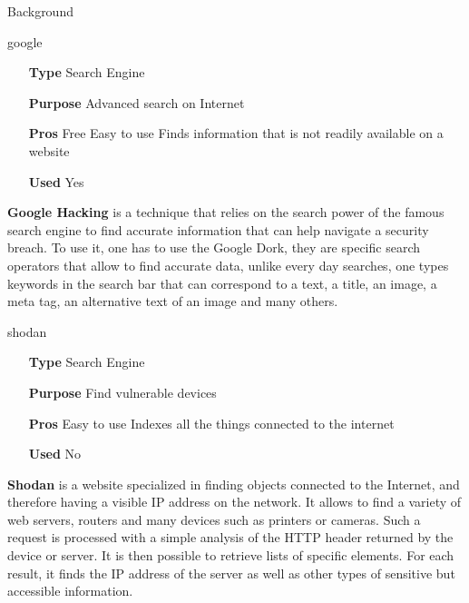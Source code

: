 \begin{chaptercover}{Background}
\begin{solutiondata}{google}
\begin{itemize}[labelsep=1cm]
  \item [\textbf{Type}] Search Engine
  \item [\textbf{Purpose}] Advanced search on Internet
  \item [\textbf{Pros}] Free \newline Easy to use \newline Finds information that is not readily available on a website
  \item [\textbf{Used}] Yes
\end{itemize}
\end{solutiondata}

\textbf{Google Hacking} \cite{google-hacking} is a technique that relies on the search power of the famous search engine to find accurate information that can help navigate a security breach. To use it, one has to use the Google Dork, they are specific search operators that allow to find accurate data, unlike every day searches, one types keywords in the search bar that can correspond to a text, a title, an image, a meta tag, an alternative text of an image and many others.

\begin{solutiondata}{shodan}
\begin{itemize}[labelsep=1cm]
  \item [\textbf{Type}] Search Engine
  \item [\textbf{Purpose}] Find vulnerable devices
  \item [\textbf{Pros}] Easy to use \newline Indexes all the things connected to the internet
  \item [\textbf{Used}] No
\end{itemize}
\end{solutiondata}

\textbf{Shodan} \cite{shodan} is a website specialized in finding objects connected to the Internet, and therefore having a visible IP address on the network. It allows to find a variety of web servers, routers and many devices such as printers or cameras. Such a request is processed with a simple analysis of the HTTP header returned by the device or server. It is then possible to retrieve lists of specific elements. For each result, it finds the IP address of the server as well as other types of sensitive but accessible information.


\end{chaptercover}
